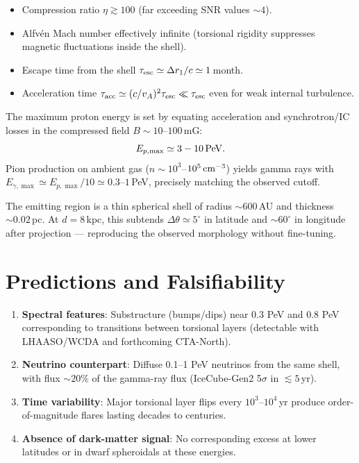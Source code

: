 \documentclass[dvipdfmx,11pt,a4paper]{article}
\begin{document}
\begin{itemize}
    \item Compression ratio $\eta \gtrsim 100$ (far exceeding SNR values $\sim 4$).
    \item Alfvén Mach number effectively infinite (torsional rigidity suppresses magnetic fluctuations inside the shell).
    \item Escape time from the shell $\tau_{\rm esc} \simeq \Delta r_1/c \simeq 1\,$month.
    \item Acceleration time $\tau_{\rm acc} \simeq (c/v_A)^2 \tau_{\rm esc} \ll \tau_{\rm esc}$ even for weak internal turbulence.
\end{itemize}

The maximum proton energy is set by equating acceleration and synchrotron/IC losses in the compressed field $B\sim 10$--$100\,$mG:
\[
E_{p,\max} \simeq 3\--10\,{\rm PeV}.
\]
Pion production on ambient gas ($n\sim 10^3$--$10^5\,{\rm cm^{-3}}$) yields gamma rays with $E_{\gamma,\max}\simeq E_{p,\max}/10 \simeq 0.3$--$1\,$PeV, precisely matching the observed cutoff.

The emitting region is a thin spherical shell of radius $\sim 600\,$AU and thickness $\sim 0.02\,$pc. At $d=8\,$kpc, this subtends $\Delta\theta \simeq 5^\circ$ in latitude and $\sim 60^\circ$ in longitude after projection — reproducing the observed morphology without fine-tuning.

\section{Predictions and Falsifiability}

\begin{enumerate}
    \item \textbf{Spectral features}: Substructure (bumps/dips) near 0.3 PeV and 0.8 PeV corresponding to transitions between torsional layers (detectable with LHAASO/WCDA and forthcoming CTA-North).
    \item \textbf{Neutrino counterpart}: Diffuse 0.1--1 PeV neutrinos from the same shell, with flux $\sim 20\%$ of the gamma-ray flux (IceCube-Gen2 5$\sigma$ in $\lesssim 5\,$yr).
    \item \textbf{Time variability}: Major torsional layer flips every $10^3$--$10^4\,$yr produce order-of-magnitude flares lasting decades to centuries.
    \item \textbf{Absence of dark-matter signal}: No corresponding excess at lower latitudes or in dwarf spheroidals at these energies.
\end{enumerate}
\end{document}

